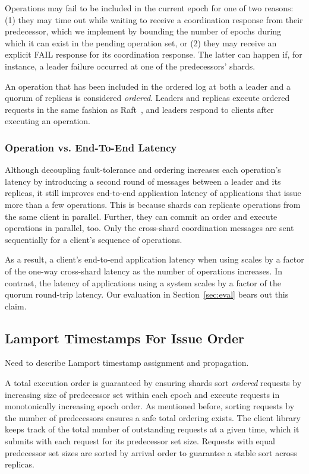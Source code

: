 Operations may fail to be included in the current epoch for one of two reasons:
(1) they may time out while waiting to receive a coordination response from their predecessor,
which we implement by bounding the number of epochs during which it can exist in the pending operation set,
or (2) they may receive an explicit FAIL response for its coordination response. The latter can happen
if, for instance, a leader failure occurred at one of the predecessors' shards.

An operation that has been included in the ordered log at both a leader and a quorum of replicas
is considered \textit{ordered}. Leaders and replicas execute ordered requests in the same fashion
as Raft~\cite{ongaro2014raft}, and leaders respond to clients after executing an operation.

\subsubsection{Operation vs. End-To-End Latency}

Although decoupling fault-tolerance and ordering increases each operation's latency by introducing a
second round of messages between a leader and its replicas, it still improves end-to-end application
latency of applications that issue more than a few operations. This is because shards can replicate
operations from the same client in parallel. Further, they can commit an order and execute operations
in parallel, too. Only the cross-shard coordination messages are sent sequentially for a client's
sequence of operations.

As a result, a client's end-to-end application latency when using \sys{} scales by a factor
of the one-way cross-shard latency as the number of operations increases. In contrast,
the latency of applications using a \singledispatch{} system scales by a factor of the
quorum round-trip latency. Our evaluation in Section~\ref{sec:eval} bears out this claim.

\subsection{Lamport Timestamps For Issue Order}

Need to describe Lamport timestamp assignment and propagation.

A total execution order is guaranteed by ensuring shards sort \textit{ordered} requests by increasing size of predecessor set within each epoch and execute requests in monotonically increasing epoch order. As mentioned before, sorting requests by the number of predecessors ensures a safe total ordering exists. The client library keeps track of the total number of outstanding requests at a given time, which it submits with each request for its predecessor set size. Requests with equal predecessor set sizes are sorted by arrival order to guarantee a stable sort across replicas.

